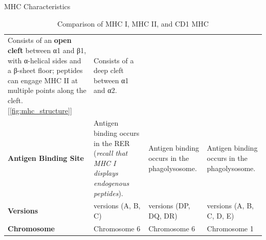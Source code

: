\begin{core}[label=core:mhc_characteristics]{MHC Characteristics}
\begin{table}[H]
\begin{tabular}{>{\raggedright\arraybackslash}p{1.2cm}>{\raggedright\arraybackslash}p{5cm}>{\raggedright\arraybackslash}p{4cm}>{\raggedright\arraybackslash}p{2.7cm}}
          Consists of an \textbf{open cleft} between α1 and β1, with α-helical sides and a β-sheet floor; peptides can engage MHC II at multiple points along the cleft. [\autoref{fig:mhc_structure}] &
          Consists of a deep cleft between α1 and α2. \\
          \textbf{Antigen Binding Site} &
          Antigen binding occurs in the RER (\textit{recall that MHC I displays endogenous peptides}). &
          Antigen binding occurs in the phagolysosome. &
          Antigen binding occurs in the phagolysosome. \\
          \textbf{Versions} &
          3 versions (A, B, C) &
          3 versions (DP, DQ, DR) &
          5 versions (A, B, C, D, E) \\
          \textbf{Chromosome} &
          Chromosome 6 &
          Chromosome 6 &
          Chromosome 1 \\
          \hline
        \end{tabular}
        \caption{Comparison of MHC I, MHC II, and CD1 MHC}
        \label{tab:mhc_comparison}
      \end{table}


    \end{core}

